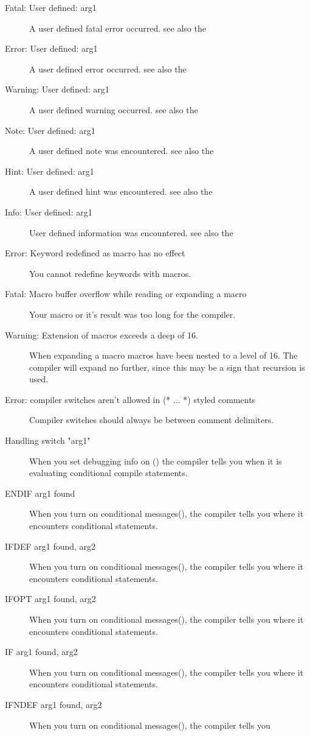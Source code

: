 \begin{description}
\item [Fatal: User defined: arg1]
 A user defined fatal error occurred. see also the \progref
\item [Error: User defined: arg1]
 A user defined error occurred. see also the \progref
\item [Warning: User defined: arg1]
 A user defined warning occurred. see also the \progref
\item [Note: User defined: arg1]
 A user defined note was encountered. see also the \progref
\item [Hint: User defined: arg1]
 A user defined hint was encountered. see also the \progref
\item [Info: User defined: arg1]
 User defined information was encountered. see also the \progref
\item [Error: Keyword redefined as macro has no effect]
 You cannot redefine keywords with macros.
\item [Fatal: Macro buffer overflow while reading or expanding a macro]
 Your macro or it's result  was too long for the compiler.
\item [Warning: Extension of macros exceeds a deep of 16.]
 When expanding a macro macros have been nested to a level of 16.
 The compiler will expand no further, since this may be a sign that
 recursion is used.
\item [Error: compiler switches aren't allowed in (* ... *) styled comments]
 Compiler switches should always be between \var{\{ \}} comment delimiters.
\item [Handling switch "arg1"]
 When you set debugging info on () the compiler tells you when it
 is evaluating conditional compile statements.
\item [ENDIF arg1 found]
 When you turn on conditional messages(), the compiler tells you
 where it encounters conditional statements.
\item [IFDEF arg1 found, arg2]
 When you turn on conditional messages(), the compiler tells you
 where it encounters conditional statements.
\item [IFOPT arg1 found, arg2]
 When you turn on conditional messages(), the compiler tells you
 where it encounters conditional statements.
\item [IF arg1 found, arg2]
 When you turn on conditional messages(), the compiler tells you
 where it encounters conditional statements.
\item [IFNDEF arg1 found, arg2]
 When you turn on conditional messages(), the compiler tells you

\end{description}

